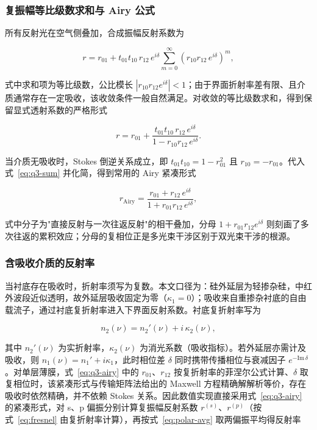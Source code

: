 \documentclass[withoutpreface,bwprint]{cumcmthesis}
\begin{document}
\subsubsection{复振幅等比级数求和与 Airy 公式}

所有反射光在空气侧叠加，合成振幅反射系数为

\begin{equation}
r = r_{01} + t_{01}t_{10}\,r_{12}\,e^{i\delta}
    \sum_{m=0}^{\infty}\left(r_{10}r_{12}\,e^{i\delta}\right)^{m},
\label{eq:q3-series}
\end{equation}

式中求和项为等比级数，公比模长 $\left|r_{10}r_{12}e^{i\delta}\right|<1$；由于界面折射率差有限、且介质通常存在一定吸收，该收敛条件一般自然满足。对收敛的等比级数求和，得到保留显式透射系数的严格形式

\begin{equation}
r = r_{01} + \frac{t_{01}t_{10}\,r_{12}\,e^{i\delta}}{1 - r_{10}r_{12}\,e^{i\delta}}.
\label{eq:q3-sum}
\end{equation}

当介质无吸收时，Stokes 倒逆关系成立，即 $t_{01}t_{10}=1-r_{01}^{2}$ 且 $r_{10}=-r_{01}$。代入式~\eqref{eq:q3-sum} 并化简，得到常用的 Airy 紧凑形式

\begin{equation}
r_{\mathrm{Airy}} = \frac{r_{01} + r_{12}\,e^{i\delta}}{1 + r_{01}r_{12}\,e^{i\delta}},
\label{eq:q3-airy}
\end{equation}

式中分子为"直接反射与一次往返反射"的相干叠加，分母 $1+r_{01}r_{12}e^{i\delta}$ 则刻画了多次往返的累积效应；分母的复相位正是多光束干涉区别于双光束干涉的根源。

\subsubsection{含吸收介质的反射率}

当衬底存在吸收时，折射率须写为复数。本文口径为：硅外延层为轻掺杂硅，中红外波段近似透明，故外延层吸收固定为零（$\kappa_1=0$）；吸收来自重掺杂衬底的自由载流子，通过衬底复折射率进入下界面反射系数。衬底复折射率写为

\begin{equation}
n_2(\nu) = n_2'(\nu) + i\,\kappa_2(\nu),
\label{eq:q3-n2complex}
\end{equation}

其中 $n_2'(\nu)$ 为实折射率，$\kappa_2(\nu)$ 为消光系数（吸收指标）。若外延层亦需计及吸收，则 $n_1(\nu)=n_1'+i\kappa_1$，此时相位差 $\delta$ 同时携带传播相位与衰减因子 $e^{-\mathrm{Im}\,\delta}$。对单层薄膜，式~\eqref{eq:q3-airy} 中的 $r_{01}$、$r_{12}$ 按复折射率的菲涅尔公式计算、$\delta$ 取复相位时，该紧凑形式与传输矩阵法给出的 Maxwell 方程精确解解析等价，存在吸收时依然精确，并不依赖 Stokes 关系。因此数值实现直接采用式~\eqref{eq:q3-airy} 的紧凑形式，对 s、p 偏振分别计算复振幅反射系数 $r^{(s)}$、$r^{(p)}$（按式~\eqref{eq:fresnel} 由复折射率计算），再按式~\eqref{eq:polar-avg} 取两偏振平均得反射率
\end{document}
